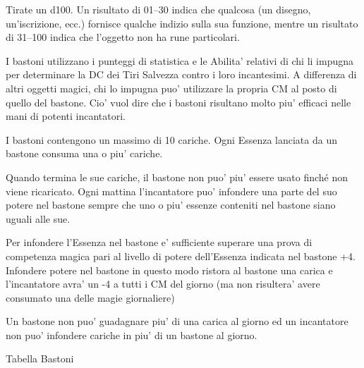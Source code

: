 \documentclass[a4paper,11pt,twoside,openany]{book}
\begin{document}
{		Tirate un d100. Un risultato di 01--30 indica che qualcosa (un disegno, un'iscrizione, ecc.) fornisce qualche indizio sulla sua funzione, mentre un risultato di 31--100 indica che l'oggetto non ha rune particolari.
		
		I bastoni utilizzano i punteggi di statistica e le Abilita' relativi di chi li impugna per determinare la DC dei Tiri Salvezza contro i loro incantesimi. A differenza di altri oggetti magici, chi lo impugna puo' utilizzare la propria CM al posto di quello del bastone. Cio' vuol dire che i bastoni risultano molto piu' efficaci nelle mani di potenti incantatori.
		
		I bastoni contengono un massimo di 10 cariche. Ogni Essenza lanciata
		da un bastone consuma una o piu' cariche.
		
		Quando termina le sue cariche, il bastone non puo' piu' essere usato finché non viene ricaricato. Ogni mattina l'incantatore puo' infondere una parte del suo potere nel bastone sempre che uno o piu' essenze conteniti nel bastone siano uguali alle sue.
		
		Per infondere l'Essenza nel bastone e' sufficiente superare una prova di competenza magica pari al livello di potere dell'Essenza indicata nel bastone +4. Infondere potere nel bastone in questo modo ristora al bastone una carica e l'incantatore avra' un -4 a tutti i CM del giorno (ma non risultera' avere consumato una delle magie giornaliere)
		
		Un bastone non puo' guadagnare piu' di una carica al giorno ed un incantatore non puo' infondere cariche in piu' di un bastone al giorno.
		
		\bigskip
		
		Tabella Bastoni
		
}
\end{document}
